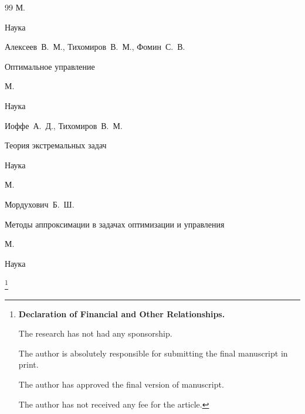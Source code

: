 \begin{thebibliography}{99}
\publaddr М. 

\publ Наука






\by Алексеев~В.~М., Тихомиров~В.~М., Фомин~С.~В. 

\book Оптимальное управление

\publaddr М.

\publ  Наука






\by Иоффе~А.~Д., Тихомиров~В.~М.

\book Теория экстремальных задач

\publ Наука

\publaddr М.






\by Мордухович~Б.~Ш.

\book Методы аппроксимации в задачах оптимизации и управления

\publaddr М.

\publ Наука







\end{thebibliography}



\RuDate



\newpage



\makeentitle







\thanks{{\bf Declaration of Financial and Other Relationships.}

The research has not had any sponsorship.

The author is absolutely responsible for submitting the final manuscript in print.

The author has approved the final version of manuscript.

The author has not received any fee for the article.

}





